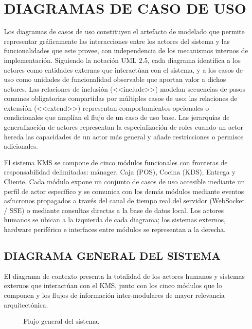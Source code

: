 \begin{landscape}
\begin{longtable}[c]{l p{2.1cm} p{2.1cm} p{8cm} p{4cm} p{3cm}}
\end{longtable}
\endgroup

\end{landscape}
\section{DIAGRAMAS DE CASO DE USO}
Los diagramas de casos de uso constituyen el artefacto de modelado que permite representar gráficamente las interacciones entre los actores del sistema y las funcionalidades que este provee, con independencia de los mecanismos internos de implementación. Siguiendo la notación UML 2.5, cada diagrama identifica a los actores como entidades externas que interactúan con el sistema, y a los casos de uso como unidades de funcionalidad observable que aportan valor a dichos actores. Las relaciones de inclusión (<<include>>) modelan secuencias de pasos comunes obligatorias compartidas por múltiples casos de uso; las relaciones de extensión (<<extend>>) representan comportamientos opcionales o condicionales que amplían el flujo de un caso de uso base. Las jerarquías de generalización de actores representan la especialización de roles cuando un actor hereda las capacidades de un actor más general y añade restricciones o permisos adicionales. 

El sistema KMS se compone de cinco módulos funcionales con fronteras de responsabilidad delimitadas: mánager, Caja (POS), Cocina (KDS), Entrega y Cliente. Cada módulo expone un conjunto de casos de uso accesible mediante un perfil de actor específico y se comunica con los demás módulos mediante eventos asíncronos propagados a través del canal de tiempo real del servidor (WebSocket / SSE) o mediante consultas directas a la base de datos local. Los actores humanos se ubican a la izquierda de cada diagrama; los sistemas externos, hardware periférico e interfaces entre módulos se representan a la derecha. 

\subsection{DIAGRAMA GENERAL DEL SISTEMA}
El diagrama de contexto presenta la totalidad de los actores humanos y sistemas externos que interactúan con el KMS, junto con los cinco módulos que lo componen y los flujos de información inter-modulares de mayor relevancia arquitectónica.

\begin{figure}[H]
    \centering
    
    \caption{Flujo general del sistema.}
    \label{fig:casos_uso_general_sistema}
\end{figure}

